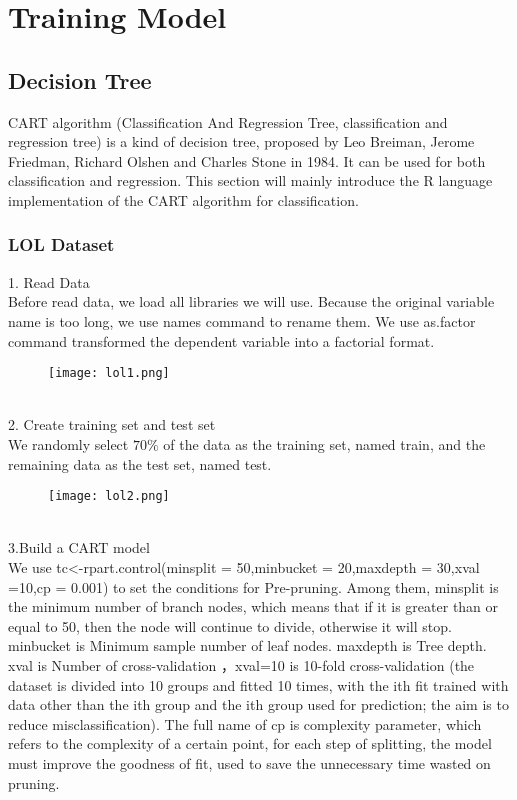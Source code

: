 \documentclass[a4paper,fleqn]{cas-sc}
\begin{document}
\section{Training Model}
\subsection{Decision Tree}
CART algorithm (Classification And Regression Tree, classification and regression tree) is a kind of decision tree, proposed by Leo Breiman, Jerome Friedman, Richard Olshen and Charles Stone in 1984. It can be used for both classification and regression. This section will mainly introduce the R language implementation of the CART algorithm for classification.\\
\subsubsection{LOL Dataset}
1. Read Data\\
Before read data, we load all libraries we will use. Because the original variable name is too long, we use names command to rename them. We use as.factor command transformed the dependent variable into a factorial format.\\
\begin{figure}[h!]
	\centering
		\texttt{[image: lol1.png]}
	\caption{}
	\label{FIG:1}
\end{figure}\\
2. Create training set and test set\\
We randomly select $70 \%$ of the data as the training set, named train, and the remaining data as the test set, named test.\\
\begin{figure}[h!]
	\centering
		\texttt{[image: lol2.png]}
	\caption{}
	\label{FIG:1}
\end{figure}\\
3.Build a CART model\\
We use tc<-rpart.control(minsplit = 50,minbucket = 20,maxdepth = 30,xval =10,cp = 0.001) to set the conditions for Pre-pruning. Among them, 
minsplit is the minimum number of branch nodes, which means that if it is greater than or equal to 50, then the node will continue to divide, otherwise it will stop. minbucket is Minimum sample number of leaf nodes. maxdepth is Tree depth. xval is Number of cross-validation ，xval=10 is 10-fold cross-validation (the dataset is divided into 10 groups and fitted 10 times, with the ith fit trained with data other than the ith group and the ith group used for prediction; the aim is to reduce misclassification). The full name of cp is complexity parameter, which refers to the complexity of a certain point, for each step of splitting, the model must improve the goodness of fit, used to save the unnecessary time wasted on pruning.\\
\end{document}
